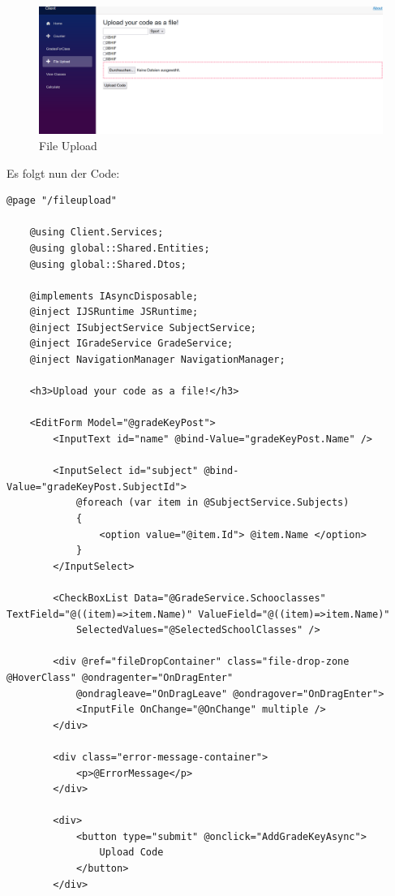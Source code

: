 \begin{figure}[H]
    \centering
    \includegraphics[scale=0.5]{pics/FileUpload.png}
    \caption{File Upload}
    \label{fig:impl:fileupload}
\end{figure}

Es folgt nun der Code:

\begin{lstlisting}[language={[Sharp]C}, caption=Code for FileUpload, label=lst:imp:fu]
    @page "/fileupload"

    @using Client.Services;
    @using global::Shared.Entities;
    @using global::Shared.Dtos;
    
    @implements IAsyncDisposable;
    @inject IJSRuntime JSRuntime;
    @inject ISubjectService SubjectService;
    @inject IGradeService GradeService;
    @inject NavigationManager NavigationManager;
    
    <h3>Upload your code as a file!</h3>
    
    <EditForm Model="@gradeKeyPost">
        <InputText id="name" @bind-Value="gradeKeyPost.Name" />
    
        <InputSelect id="subject" @bind-Value="gradeKeyPost.SubjectId">
            @foreach (var item in @SubjectService.Subjects)
            {
                <option value="@item.Id"> @item.Name </option>
            }
        </InputSelect>
    
        <CheckBoxList Data="@GradeService.Schooclasses" TextField="@((item)=>item.Name)" ValueField="@((item)=>item.Name)"
            SelectedValues="@SelectedSchoolClasses" />
    
        <div @ref="fileDropContainer" class="file-drop-zone @HoverClass" @ondragenter="OnDragEnter"
            @ondragleave="OnDragLeave" @ondragover="OnDragEnter">
            <InputFile OnChange="@OnChange" multiple />
        </div>
    
        <div class="error-message-container">
            <p>@ErrorMessage</p>
        </div>
    
        <div>
            <button type="submit" @onclick="AddGradeKeyAsync">
                Upload Code
            </button>
        </div>
        

\end{lstlisting}
